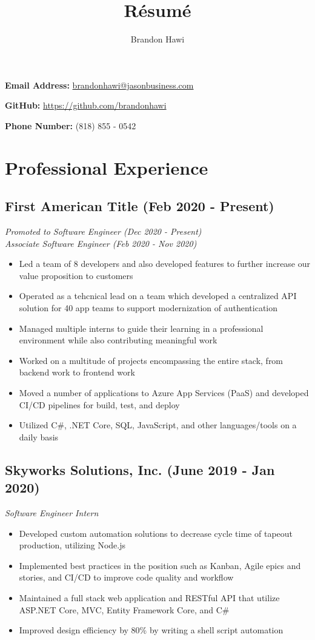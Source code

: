 \documentclass[10pt]{article}
\makeatletter
\renewcommand{\maketitle}
{
\huge
\noindent\textbf{\theauthor} \hfill \small{ \textbf{Email Address: }\href{mailto:brandonhawi@jasonbusiness.com}{brandonhawi@jasonbusiness.com}

\hfill \textbf{GitHub: }\href{https://github.com/brandonhawi}{https://github.com/brandonhawi}

\hfill \textbf{Phone Number: }(818) 855 - 0542}}
\makeatother
\begin{document}
\title{R\'esum\'e}
\author{Brandon Hawi}

\maketitle
\vspace{-0.1in}

\section{Professional Experience}

\subsection{First American Title (Feb 2020 - Present)}

\noindent\textit{Promoted to Software Engineer (Dec 2020 - Present)}\\
\noindent\textit{Associate Software Engineer (Feb 2020 - Nov 2020)}

\begin{itemize}
	\setlength\itemsep{0em}
	\item Led a team of 8 developers and also developed features to further increase our value proposition to customers
	\item Operated as a tehcnical lead on a team which developed a centralized API solution for 40 app teams to support modernization of authentication
	\item Managed multiple interns to guide their learning in a professional environment while also contributing meaningful work
	\item Worked on a multitude of projects encompassing the entire stack, from backend work to frontend work
	\item Moved a number of applications to Azure App Services (PaaS) and developed CI/CD pipelines for build, test, and deploy
	\item Utilized C\#,  .NET Core,  SQL,  JavaScript,  and other languages/tools on a daily basis
\end{itemize}

\subsection{Skyworks Solutions, Inc. (June 2019 - Jan 2020)}

\noindent\textit{Software Engineer Intern}

\begin{itemize}
	\setlength\itemsep{0em}
	\item Developed custom automation solutions to decrease cycle time of tapeout production,  utilizing Node.js 
	\item Implemented best practices in the position such as Kanban, Agile epics and stories, and CI/CD to improve code quality and workflow
	\item Maintained a full stack web application and RESTful API that utilize ASP.NET Core, MVC, Entity Framework Core, and C\#
	\item Improved design efficiency by 80\% by writing a shell script automation
\end{itemize}
\end{document}
